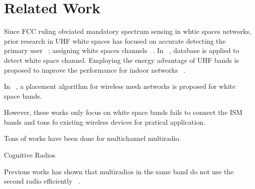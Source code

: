 \section{Related Work}
\label{sec:related}
Since FCC ruling obviated mandatory spectrum sensing in whtie spaces networks, prior research in UHF white spaces has focused on accurate detecting the primary user ~\cite{kim2008fast}; assigning white spaces channels ~\cite{bahl2009white}.
In ~\cite{murty2012senseless}, database is applied to detect white space channel.
Employing the energy advantage of UHF bands is proposed to improve the performance for indoor networks ~\cite{radunovic2010rethinking}.   


In ~\cite{robinson2010deploying}, a placement algorithm for wireless mesh networks is proposed for white space bands.

However, these works only focus on white space bands fails to connect the ISM bands and tons fo existing wireless devices for pratical application.

 Tons of works have been done for multichannel multiradio.

 Cognitive Radios




Previous works has shown that multiradios in the same band do not use the second radio efficiently ~\cite{robinson2007performance}.
 
